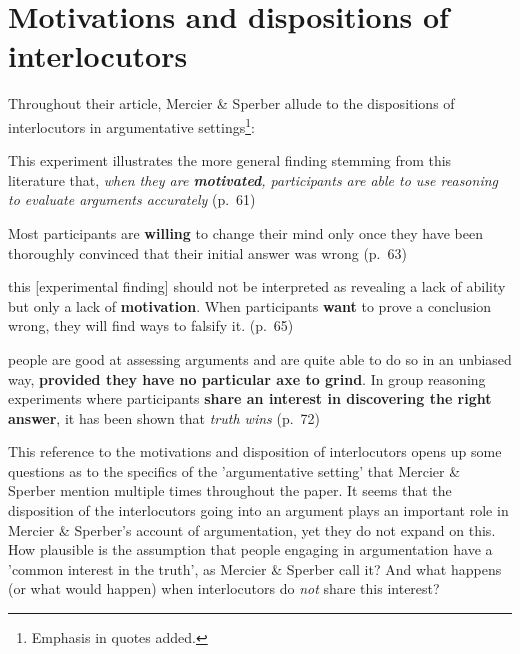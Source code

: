 
\section{Motivations and dispositions of interlocutors}

Throughout their \citeyear{MS11} article, Mercier \& Sperber allude to the dispositions
of interlocutors in argumentative settings\footnote{Emphasis in quotes added.}:
\begin{quoting}
    This experiment illustrates the more general finding stemming from this literature that, \emph{when they are \textbf{motivated}, participants are able to use reasoning to evaluate arguments accurately}
    \hfill (p.~61)
\end{quoting}
\begin{quoting}
    Most participants are \textbf{willing} to change their mind only once they have been thoroughly convinced that their initial answer was wrong
    \hfill (p.~63)
\end{quoting}
\begin{quoting}
    this [experimental finding] should not be interpreted as revealing a lack of ability but only a lack of \textbf{motivation}. When participants \textbf{want} to prove a conclusion wrong, they will find ways to falsify it.
    \hfill (p.~65)
\end{quoting}
\begin{quoting}
    people are good at assessing arguments and are quite able to do so in an unbiased way, \textbf{provided they have no particular axe to grind}. In group reasoning experiments where participants \textbf{share an interest in discovering the right answer}, it has been shown that \emph{truth wins}
    \hfill (p.~72)
\end{quoting}
This reference to the motivations and disposition of interlocutors opens up some questions as to the specifics of the 'argumentative setting' that Mercier \& Sperber mention multiple times throughout the paper. It seems that the disposition of the interlocutors going into an argument plays an important role in Mercier \& Sperber's account of argumentation, yet they do not expand on this.
How plausible is the assumption that people engaging in argumentation have a 'common interest in the truth', as Mercier \& Sperber call it? And what happens (or what would happen) when interlocutors do \emph{not} share this interest?


